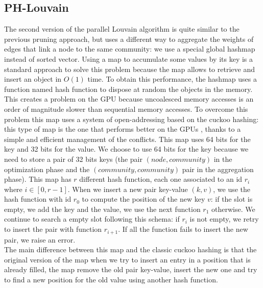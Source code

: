 \subsection{PH-Louvain}
The second version of the parallel Louvain algorithm is quite similar to the previous pruning approach, but uses a different way to aggregate the weights of edges that link a node to the same community: we use a special global hashmap instead of sorted vector.
Using a map to accumulate some values by its key is a standard approach to solve this problem because the map allows to retrieve and insert an object in $O(1)$ time. 
To obtain this performance, the hashmap uses a function named hash function to dispose at random the objects in the memory. This creates a problem on the GPU because uncoalesced memory accesses is an order of magnitude slower than sequential memory accesses. 
To overcome this problem this map uses a system of open-addressing based on the cuckoo hashing: this type of map is the one that performs better on the GPUs \cite{alcantara2012building}, thanks to a simple and efficient management of the conflicts. This map uses 64 bits for the key and 32 bits for the value. We choose to use 64 bits for the key because we need to store a pair of 32 bits keys (the pair $(node, community)$ in the optimization phase and the $(community, community)$ pair in the aggregation phase). This map has $r$ different hash function, each one associated to an id $r_i$ where $i \in [0, r-1]$. When we insert a new pair key-value $(k,v)$, we use the hash function with id $r_0$ to compute the position of the new key $v$: if the slot is empty, we add the key and the value, we use the next function $r_1$ otherwise. We continue to search a empty slot following this schema: if $r_i$ is not empty, we retry to insert the pair with function $r_{i+1}$. If all the function fails to insert the new pair, we raise an error.\\ 
The main difference between this map and the classic cuckoo hashing is that 
the original version of the map when we try to insert an entry in a position that is already filled, the map remove the old pair key-value, insert the new one and try to find a new position for the old value using another hash function.  
